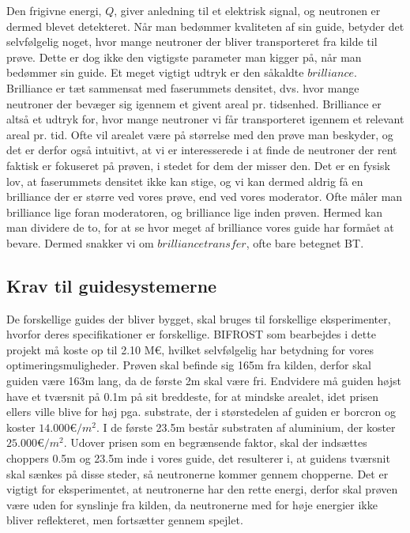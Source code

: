 \documentclass[12pt,oneside,a4paper]{article}
\begin{document}
{{{{{Den frigivne energi, $Q$, giver anledning til et elektrisk signal, og neutronen er dermed blevet detekteret.
Når man bedømmer kvaliteten af sin guide, betyder det selvfølgelig noget, hvor mange neutroner der bliver transporteret fra kilde til prøve. Dette er dog ikke den vigtigste parameter man kigger på, når man bedømmer sin guide. Et meget vigtigt udtryk er den såkaldte $brilliance$. Brilliance er tæt sammensat med faserummets densitet, dvs. hvor mange neutroner der bevæger sig igennem et givent areal pr. tidsenhed. Brilliance er altså et udtryk for, hvor mange neutroner vi får transporteret igennem et relevant areal pr. tid. Ofte vil arealet være på størrelse med den prøve man beskyder, og det er derfor også intuitivt, at vi er interesserede i at finde de neutroner der rent faktisk er fokuseret på prøven, i stedet for dem der misser den. Det er en fysisk lov, at faserummets densitet ikke kan stige, og vi kan dermed aldrig få en brilliance der er større ved vores prøve, end ved vores moderator. Ofte måler man brilliance lige foran moderatoren, og brilliance lige inden prøven. Hermed kan man dividere de to, for at se hvor meget af brilliance vores guide har formået at bevare. Dermed snakker vi om $brilliance transfer$, ofte bare betegnet BT. \cite{lefmann_arleth_kirkensgaard_lebech_thomsen}




\subsection{Krav til guidesystemerne}
De forskellige guides der bliver bygget, skal bruges til forskellige eksperimenter, hvorfor deres specifikationer er forskellige. BIFROST som bearbejdes i dette projekt må koste op til 2.10 M€, hvilket selvfølgelig har betydning for vores optimeringsmuligheder. Prøven skal befinde sig 165m fra kilden, derfor skal guiden være 163m lang, da de første 2m skal være fri. Endvidere må guiden højst have et tværsnit på 0.1m på sit breddeste, for at mindske arealet, idet prisen ellers ville blive for høj pga. substrate, der i størstedelen af guiden er borcron og koster $14.000 \text{€}/m^2$. I de første 23.5m består substraten af aluminium, der koster $25.000 \text{€}/m^2$. Udover prisen som en begrænsende faktor, skal der indsættes choppers 0.5m og 23.5m inde i vores guide, det resulterer i, at guidens tværsnit skal sænkes på disse steder, så neutronerne kommer gennem chopperne. Det er vigtigt for eksperimentet, at neutronerne har den rette energi, derfor skal prøven være uden for synslinje fra kilden, da neutronerne med for høje energier ikke bliver reflekteret, men fortsætter gennem spejlet.

}}}}}
\end{document}
